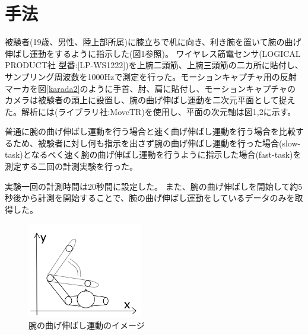 \documentclass{jsarticle}
\begin{document}

\section{手法}
被験者(19歳、男性、陸上部所属)に膝立ちで机に向き、利き腕を置いて腕の曲げ伸ばし運動をするように指示した(図1参照)。
ワイヤレス筋電センサ(LOGICAL PRODUCT社 型番:[LP-WS1222])を上腕二頭筋、上腕三頭筋の二カ所に貼付し、サンプリング周波数を1000Hzで測定を行った。モーションキャプチャ用の反射マーカを図\ref{karada2}のように手首、肘、肩に貼付し、モーションキャプチャのカメラは被験者の頭上に設置し、腕の曲げ伸ばし運動を二次元平面として捉えた。解析には(ライブラリ社:MoveTR)を使用し、平面の次元軸は図1,2に示す。

普通に腕の曲げ伸ばし運動を行う場合と速く曲げ伸ばし運動を行う場合を比較するため、被験者に対し何も指示を出さず腕の曲げ伸ばし運動を行った場合(slow-task)となるべく速く腕の曲げ伸ばし運動を行うように指示した場合(fast-task)を測定する二回の計測実験を行った。

実験一回の計測時間は20秒間に設定した。
また、腕の曲げ伸ばしを開始して約5秒後から計測を開始することで、腕の曲げ伸ばし運動をしているデータのみを取得した。

\begin{figure}[htb]
  \begin{center}
    \includegraphics[width=5cm]{karada1.png}
    \caption{腕の曲げ伸ばし運動のイメージ}
    \label{karada1}
  \end{center}
\end{figure}

\end{document}
